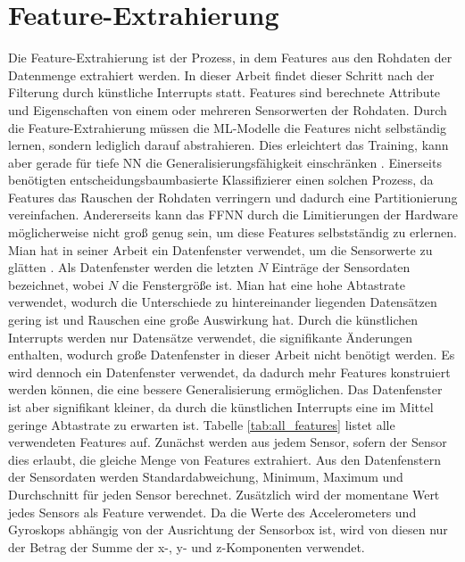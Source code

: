 \section{Feature-Extrahierung}
Die Feature-Extrahierung ist der Prozess, in dem Features aus den Rohdaten der Datenmenge extrahiert werden.
In dieser Arbeit findet dieser Schritt nach der Filterung durch künstliche Interrupts statt.
Features sind berechnete Attribute und Eigenschaften von einem oder mehreren Sensorwerten der Rohdaten.
\newpage
Durch die Feature-Extrahierung müssen die ML-Modelle die Features nicht selbständig lernen, sondern lediglich darauf abstrahieren.
Dies erleichtert das Training, kann aber gerade für tiefe NN die Generalisierungsfähigkeit einschränken \cite{seide2011feature}.
Einerseits benötigten entscheidungsbaumbasierte Klassifizierer einen solchen Prozess,
da Features das Rauschen der Rohdaten verringern und dadurch eine Partitionierung vereinfachen.
Andererseits kann das FFNN durch die Limitierungen der Hardware möglicherweise nicht groß genug sein, um diese Features selbstständig zu erlernen.
\newline
\newline
Mian hat in seiner Arbeit ein Datenfenster verwendet, um die Sensorwerte zu glätten \cite{naveedThesis}.
Als Datenfenster werden die letzten $N$ Einträge der Sensordaten bezeichnet, wobei $N$ die Fenstergröße ist.
Mian hat eine hohe Abtastrate verwendet, wodurch die Unterschiede zu hintereinander liegenden Datensätzen gering ist und Rauschen eine große Auswirkung hat.
Durch die künstlichen Interrupts werden nur Datensätze verwendet, die signifikante Änderungen enthalten,
wodurch große Datenfenster in dieser Arbeit nicht benötigt werden.
Es wird dennoch ein Datenfenster verwendet, da dadurch mehr Features konstruiert werden können, die eine bessere Generalisierung ermöglichen.
Das Datenfenster ist aber signifikant kleiner, da durch die künstlichen Interrupts eine im Mittel geringe Abtastrate zu erwarten ist.
\newline
\newline
Tabelle \ref{tab:all_features} listet alle verwendeten Features auf.
Zunächst werden aus jedem Sensor, sofern der Sensor dies erlaubt, die gleiche Menge von Features extrahiert.
Aus den Datenfenstern der Sensordaten werden Standardabweichung, Minimum, Maximum und Durchschnitt für jeden Sensor berechnet.
Zusätzlich wird der momentane Wert jedes Sensors als Feature verwendet.
Da die Werte des Accelerometers und Gyroskops abhängig von der Ausrichtung der Sensorbox ist,
wird von diesen nur der Betrag der Summe der x-, y- und z-Komponenten verwendet.
